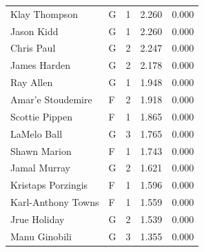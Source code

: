 \begin{table}[t]
\begin{tabular*}{\linewidth}{@{\extracolsep{\fill}}llcrr}
Klay Thompson & G & 1 & 2.260 & 0.000 \\ 
Jason Kidd & G & 1 & 2.260 & 0.000 \\ 
Chris Paul & G & 2 & 2.247 & 0.000 \\ 
James Harden & G & 2 & 2.178 & 0.000 \\ 
Ray Allen & G & 1 & 1.948 & 0.000 \\ 
Amar'e Stoudemire & F & 2 & 1.918 & 0.000 \\ 
Scottie Pippen & F & 1 & 1.865 & 0.000 \\ 
LaMelo Ball & G & 3 & 1.765 & 0.000 \\ 
Shawn Marion & F & 1 & 1.743 & 0.000 \\ 
Jamal Murray & G & 2 & 1.621 & 0.000 \\ 
Kristaps Porzingis & F & 1 & 1.596 & 0.000 \\ 
Karl-Anthony Towns & F & 1 & 1.559 & 0.000 \\ 
Jrue Holiday & G & 2 & 1.539 & 0.000 \\ 
Manu Ginobili & G & 3 & 1.355 & 0.000 \\ 
\bottomrule
\end{tabular*}
\end{table}

